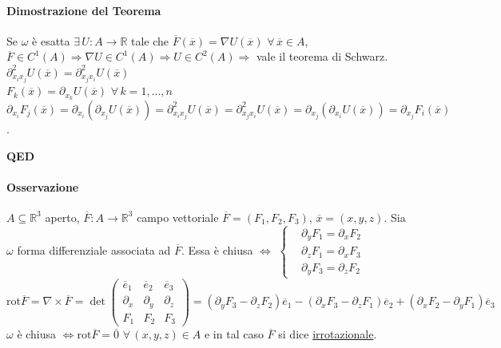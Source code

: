\documentclass{article}
\newcommand{\R}{\mathbb{R}}
\begin{document}
\paragraph{{Dimostrazione del Teorema}}
Se $\omega$ è esatta $\exists \, U : A\rightarrow \R$ tale che $\overline{F}(\overline{x})=\nabla U(\overline{x})\,\, \forall\, \overline{x}\in A$, $\overline{F}\in C^1(A)\Rightarrow \nabla U \in C^1(A) \Rightarrow U \in C^2(A)\Rightarrow $ vale il teorema di Schwarz. \\
$\partial_{x_ix_j}^2U(\overline{x})=\partial_{x_jx_i}^2U(\overline{x})$\\
$F_k(\overline{x})=\partial_{x_k}U(\overline{x})\,\, \forall \, k =1,...,n$\\
$\partial_{x_i}F_j(\overline{x})=\partial_{x_i}(\partial_{x_j}U(\overline{x}))=\partial_{x_ix_j}^2U(\overline{x})=\partial_{x_jx_i}^2U(\overline{x})=\partial_{x_j}(\partial_x_iU(\overline{x}))=\partial_{x_j}F_i(\overline{x})$.
\begin{flushright}
    \textbf{QED}
\end{flushright}

\paragraph{{Osservazione}}
$A \subseteq \R^3$ aperto, $\overline{F}: A \rightarrow \R^3$ campo vettoriale $\overline{F}= (F_1,F_2,F_3)$, $\overline{x}=(x,y,z)$. Sia $\omega$ forma differenziale associata ad $\overline{F}$. Essa è chiusa $\Leftrightarrow$
$\begin{cases}
    &\partial_yF_1=\partial_xF_2\\
    &\partial_zF_1=\partial_x F_3\\
    &\partial_yF_3= \partial_z F_2
\end{cases}$\\
$\text{rot}\overline{F}=\nabla\times \overline{F}=\det \begin{pmatrix}
    \overline{e}_1 & \overline{e}_2 & \overline{e}_3\\
    \partial_x &\partial_y &\partial_z\\
    F_1 &F_2 &F_3
\end{pmatrix}= (\partial_yF_3-\partial_zF_2)\overline{e}_1-(\partial_xF_3-\partial_zF_1)\overline{e}_2+(\partial_xF_2-\partial_yF_1)\overline{e}_3$\\
$\omega $ è chiusa $\Leftrightarrow \text{rot}\overline{F}=\overline{0}\,\, \forall \, (x,y,z)\in A$ e in tal caso $\overline{F}$ si dice \underline{irrotazionale}.
\end{document}

